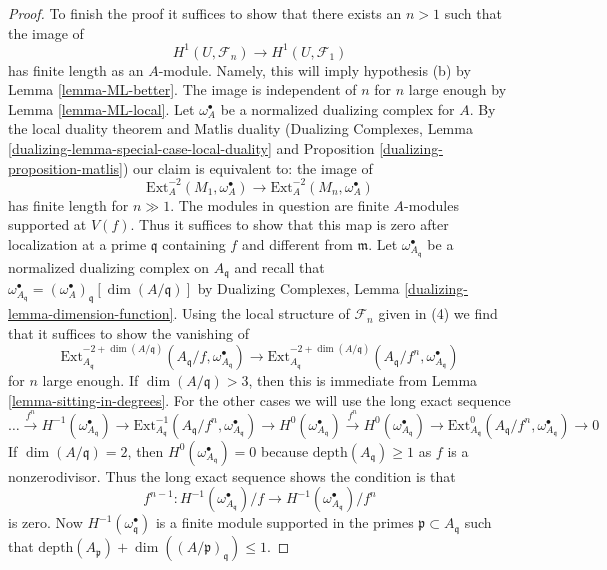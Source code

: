 \begin{proof}
\medskip\noindent
To finish the proof it suffices to show that there exists an $n > 1$
such that the image of
$$
H^1(U, \mathcal{F}_n) \longrightarrow H^1(U, \mathcal{F}_1)
$$
has finite length as an $A$-module. Namely, this will imply hypothesis (b)
by Lemma \ref{lemma-ML-better}. The image is independent
of $n$ for $n$ large enough by Lemma \ref{lemma-ML-local}.
Let $\omega_A^\bullet$ be a normalized dualizing complex for $A$.
By the local duality theorem and Matlis duality
(Dualizing Complexes, Lemma \ref{dualizing-lemma-special-case-local-duality}
and Proposition \ref{dualizing-proposition-matlis})
our claim is equivalent to: the image of
$$
\text{Ext}^{-2}_A(M_1, \omega_A^\bullet) \to
\text{Ext}^{-2}_A(M_n, \omega_A^\bullet)
$$
has finite length for $n \gg 1$. The modules in question are
finite $A$-modules supported at $V(f)$. Thus it suffices to show that this
map is zero after localization at a prime $\mathfrak q$
containing $f$ and different from $\mathfrak m$.
Let $\omega_{A_\mathfrak q}^\bullet$ be a normalized
dualizing complex on $A_\mathfrak q$ and recall that
$\omega_{A_\mathfrak q}^\bullet =
(\omega_A^\bullet)_\mathfrak q[\dim(A/\mathfrak q)]$ by
Dualizing Complexes, Lemma \ref{dualizing-lemma-dimension-function}.
Using the local structure of $\mathcal{F}_n$ given in (4)
we find that it suffices to show the vanishing of
$$
\text{Ext}^{-2 + \dim(A/\mathfrak q)}_{A_\mathfrak q}(
A_\mathfrak q/f, \omega_{A_\mathfrak q}^\bullet)
\to
\text{Ext}^{-2 + \dim(A/\mathfrak q)}_{A_\mathfrak q}(
A_\mathfrak q/f^n, \omega_{A_\mathfrak q}^\bullet)
$$
for $n$ large enough. If $\dim(A/\mathfrak q) > 3$, then this is immediate from
Lemma \ref{lemma-sitting-in-degrees}. For the other cases
we will use the long exact sequence
$$
\ldots
\xrightarrow{f^n}
H^{-1}(\omega_{A_\mathfrak q}^\bullet)
\to
\text{Ext}^{-1}_{A_\mathfrak q}(
A_\mathfrak q/f^n, \omega_{A_\mathfrak q}^\bullet) \to
H^0(\omega_{A_\mathfrak q}^\bullet)
\xrightarrow{f^n}
H^0(\omega_{A_\mathfrak q}^\bullet)
\to
\text{Ext}^0_{A_\mathfrak q}(
A_\mathfrak q/f^n, \omega_{A_\mathfrak q}^\bullet) \to 0
$$
If $\dim(A/\mathfrak q) = 2$, then
$H^0(\omega_{A_\mathfrak q}^\bullet) = 0$
because $\text{depth}(A_\mathfrak q) \geq 1$ as
$f$ is a nonzerodivisor.
Thus the long exact sequence shows the condition is that
$$
f^{n - 1} :
H^{-1}(\omega_{A_\mathfrak q}^\bullet)/f \to
H^{-1}(\omega_{A_\mathfrak q}^\bullet)/f^n
$$
is zero. Now $H^{-1}(\omega^\bullet_\mathfrak q)$ is a finite
module supported in the primes $\mathfrak p \subset A_\mathfrak q$ such that
$\text{depth}(A_\mathfrak p) + \dim((A/\mathfrak p)_\mathfrak q) \leq 1$.

\end{proof}
